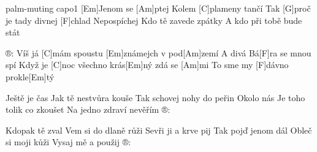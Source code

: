 \hfill palm-muting capo1
[Em]Jenom se [Am]ptej 
Kolem [C]plameny tančí 
Tak [G]proč je tady divnej [F]chlad 
Nepospíchej 
Kdo tě zavede zpátky 
A kdo při tobě bude stát 

®: Víš já [C]mám spoustu [Em]známejch v pod[Am]zemí 
A divá Bá[F]ra se mnou spí 
Když je [C]noc všechno krás[Em]ný zdá se [Am]mi 
To sme my [F]dávno prokle[Em]tý 
\begin{multicols}{2}
	Ještě je čas 
	Jak tě nestvůra kouše 
	Tak schovej nohy do peřin 
	Okolo nás 
	Je toho tolik co zkoušet 
	Na jedno zdraví nevěřím 
	®: 
	
	Kdopak tě zval 
	Vem si do dlaně růži 
	Sevři ji a krve pij 
	Tak pojď jenom dál 
	Obleč si moji kůži 
	Vysaj mě a použij 
	®: 
\end{multicols}